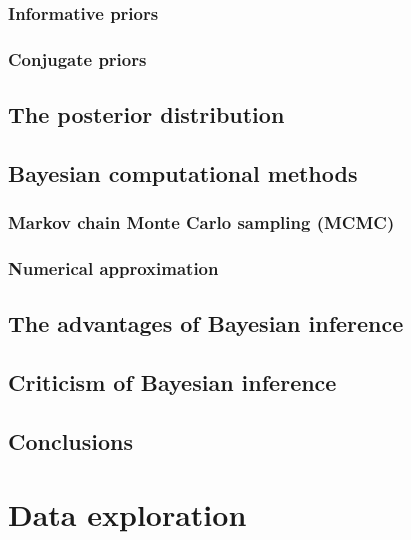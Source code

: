 \documentclass[
]{book}
\begin{document}
\hypertarget{inform-priors}{%
\subsection{Informative priors}\label{inform-priors}}

\hypertarget{conj-priors}{%
\subsection{Conjugate priors}\label{conj-priors}}

\hypertarget{post-dist}{%
\section{The posterior distribution}\label{post-dist}}

\hypertarget{comp-methods}{%
\section{Bayesian computational methods}\label{comp-methods}}

\hypertarget{mcmc}{%
\subsection{Markov chain Monte Carlo sampling (MCMC)}\label{mcmc}}

\hypertarget{inla}{%
\subsection{Numerical approximation}\label{inla}}

\hypertarget{bayes-pros}{%
\section{The advantages of Bayesian inference}\label{bayes-pros}}

\hypertarget{bayes-critics}{%
\section{Criticism of Bayesian inference}\label{bayes-critics}}

\hypertarget{bayes-concl}{%
\section{Conclusions}\label{bayes-concl}}

\hypertarget{data-exploration}{%
\chapter{Data exploration}\label{data-exploration}}
\end{document}
